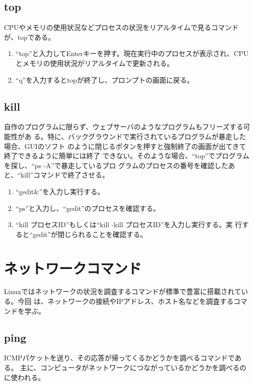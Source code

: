 \subsection{top}
CPUやメモリの使用状況などプロセスの状況をリアルタイムで見るコマンドが、topである。

\begin{enumerate}
\item ``top''と入力してEnterキーを押す。現在実行中のプロセスが表示され、CPU
とメモリの使用状況がリアルタイムで更新される。
\item ``q''を入力するとtopが終了し、プロンプトの画面に戻る。
\end{enumerate}

\subsection{kill}

自作のプログラムに限らず、ウェブサーバのようなプログラムもフリーズする可能性があ
る。特に、バックグラウンドで実行されているプログラムが暴走した場合、GUIのソフト
のように閉じるボタンを押すと強制終了の画面が出てきて終了できるように簡単には終了
できない。そのような場合、``top''でプログラムを探し、``ps -A''で暴走しているプロ
グラムのプロセスの番号を確認したあと、``kill''コマンドで終了させる。

\begin{enumerate}
\item ``gedit\&''を入力し実行する。
\item ``ps''と入力し、``gedit''のプロセスを確認する。
\item ``kill プロセスID''もしくは``kill -kill プロセスID''を入力し実行する。実
      行すると``gedit''が閉じられることを確認する。
\end{enumerate}

\section{ネットワークコマンド}

Linuxではネットワークの状況を調査するコマンドが標準で豊富に搭載されている。今回
は、ネットワークの接続やIPアドレス、ホスト名などを調査するコマンドを学ぶ。

\subsection{ping}

ICMPパケットを送り、その応答が帰ってくるかどうかを調べるコマンドである。
主に、コンピュータがネットワークにつながっているかどうかを調べるのに使われる。

